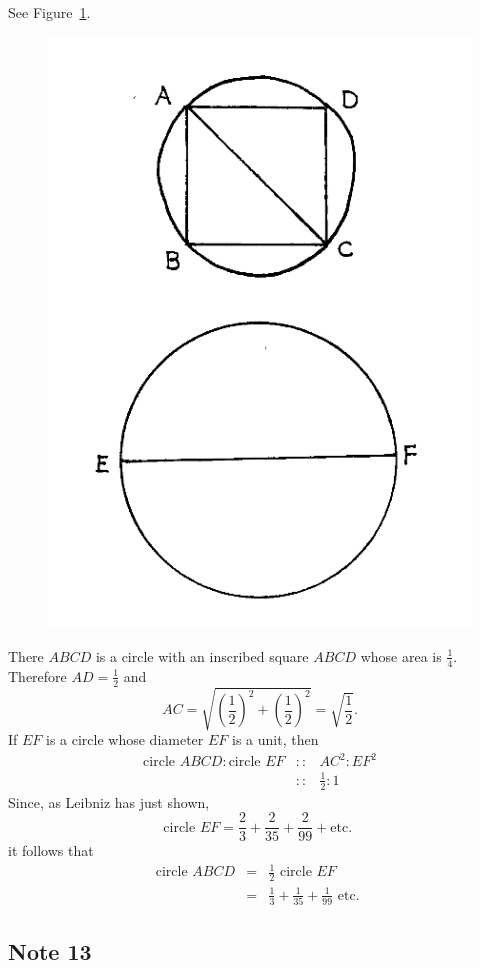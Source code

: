 \documentclass[twoside,openright]{article}
\begin{document}
See Figure~\ref{doubcirc}.
\begin{figure}[htp]
  \begin{center}
    \includegraphics[width=.5\textwidth]{fig/Figure63}
    \caption{}
    \label{doubcirc}
    \vspace{-10pt}
  \end{center}
\end{figure} There $ABCD$ is a circle with an inscribed square $ABCD$
whose area is $\frac{1}{4}$.  Therefore $AD = \frac{1}{2}$ and
$$AC = \sqrt{\left(\frac{1}{2}\right)^2 + \left(\frac{1}{2}\right)^2} = \sqrt{\frac{1}{2}}.$$
If $EF$ is a circle whose diameter $EF$ is a unit, then
\begin{eqnarray*}
  \mbox{circle }ABCD \!:\! \mbox{circle }EF &  :: & AC^2 \!:\! EF^2\\
                                            & ::& \frac{1}{2} \!:\! 1
\end{eqnarray*}
Since, as Leibniz has just shown,
$$\mbox{circle }EF = \frac{2}{3} + \frac{2}{35} + \frac{2}{99} + \mbox{etc. }$$
it follows that 
\begin{eqnarray*}
  \mbox{circle }ABCD & = & \frac{1}{2}\mbox{ circle }EF \\
                     & = & \frac{1}{3} +\frac{1}{35} + \frac{1}{99}\mbox{ etc. }
\end{eqnarray*}

\subsection*{Note 13}
\label{ctp13}
\end{document}
